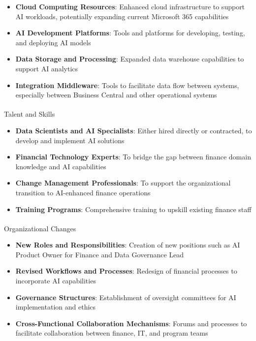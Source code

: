 \documentclass[
]{article}
\makeatletter
\let\oldparagraph\paragraph
\renewcommand{\paragraph}{
    \@ifstar
      \xxxParagraphStar
      \xxxParagraphNoStar
  }
\newcommand{\xxxParagraphStar}[1]{\oldparagraph*{#1}\mbox{}}
\newcommand{\xxxParagraphNoStar}[1]{\oldparagraph{#1}\mbox{}}
\providecommand{\tightlist}{%
  \setlength{\itemsep}{0pt}\setlength{\parskip}{0pt}}\usepackage{longtable,booktabs,array}
\makeatother
\begin{document}
\begin{itemize}
\tightlist
\item
  \textbf{Cloud Computing Resources}: Enhanced cloud infrastructure to
  support AI workloads, potentially expanding current Microsoft 365
  capabilities
\item
  \textbf{AI Development Platforms}: Tools and platforms for developing,
  testing, and deploying AI models
\item
  \textbf{Data Storage and Processing}: Expanded data warehouse
  capabilities to support AI analytics
\item
  \textbf{Integration Middleware}: Tools to facilitate data flow between
  systems, especially between Business Central and other operational
  systems
\end{itemize}

\paragraph{Talent and Skills}\label{talent-and-skills}

\begin{itemize}
\tightlist
\item
  \textbf{Data Scientists and AI Specialists}: Either hired directly or
  contracted, to develop and implement AI solutions
\item
  \textbf{Financial Technology Experts}: To bridge the gap between
  finance domain knowledge and AI capabilities
\item
  \textbf{Change Management Professionals}: To support the
  organizational transition to AI-enhanced finance operations
\item
  \textbf{Training Programs}: Comprehensive training to upskill existing
  finance staff
\end{itemize}

\paragraph{Organizational Changes}\label{organizational-changes}

\begin{itemize}
\tightlist
\item
  \textbf{New Roles and Responsibilities}: Creation of new positions
  such as AI Product Owner for Finance and Data Governance Lead
\item
  \textbf{Revised Workflows and Processes}: Redesign of financial
  processes to incorporate AI capabilities
\item
  \textbf{Governance Structures}: Establishment of oversight committees
  for AI implementation and ethics
\item
  \textbf{Cross-Functional Collaboration Mechanisms}: Forums and
  processes to facilitate collaboration between finance, IT, and program
  teams
\end{itemize}
\end{document}
